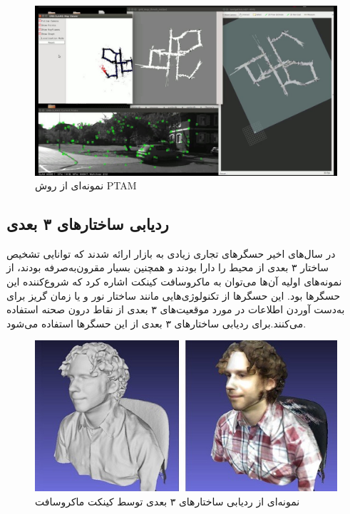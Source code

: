 		\begin{figure}
		\centering
		\includegraphics[width=1\linewidth]{image/ptam}
		\caption {نمونه‌ای از روش PTAM    \cite{murORB2}}
		\label{fig:ptam}
	\end{figure}
	


\subsection{ردیابی ساختارهای ۳ بعدی}
در سال‌های اخیر حسگرهای تجاری زیادی به بازار ارائه شدند که توانایی تشخیص ساختار ۳ بعدی از محیط را دارا بودند و همچنین بسیار مقرون‌به‌صرفه بودند، از نمونه‌های اولیه آن‌ها می‌توان به ماکروسافت کینکت اشاره کرد که شروع‌کننده این حسگرها بود\cite{zhang2012microsoft}. این حسگرها از تکنولوژی‌هایی مانند ساختار نور\cite{scharstein2003high} و یا زمان گریز \cite{gokturk2004time}برای به‌دست آوردن اطلاعات در مورد موقعیت‌های ۳ بعدی از نقاط درون صحنه استفاده می‌کنند.برای ردیابی ساختارهای ۳ بعدی از این حسگرها استفاده می‌شود.
\begin{figure}
	\centering
	\includegraphics[width=1\linewidth]{image/kinect}
	\caption {نمونه‌ای از ردیابی ساختارهای ۳ بعدی توسط کینکت ماکروسافت    \cite{izadi2011kinectfusion}}
	\label{fig:kinect}
\end{figure}


